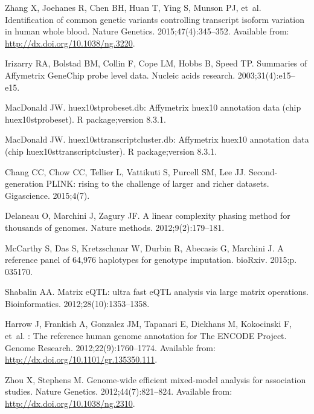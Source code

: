 \documentclass[10pt,letterpaper]{article}
\begin{document}
\begin{thebibliography}{10}
Zhang X, Joehanes R, Chen BH, Huan T, Ying S, Munson PJ, et~al.
\newblock Identification of common genetic variants controlling transcript
  isoform variation in human whole blood.
\newblock Nature Genetics. 2015;47(4):345--352.
\newblock Available from: \url{http://dx.doi.org/10.1038/ng.3220}.

Irizarry RA, Bolstad BM, Collin F, Cope LM, Hobbs B, Speed TP.
\newblock Summaries of Affymetrix GeneChip probe level data.
\newblock Nucleic acids research. 2003;31(4):e15--e15.

MacDonald JW.
\newblock huex10stprobeset.db: Affymetrix huex10 annotation data (chip
  huex10stprobeset).
\newblock R package;version 8.3.1.

MacDonald JW.
\newblock huex10sttranscriptcluster.db: Affymetrix huex10 annotation data (chip
  huex10sttranscriptcluster).
\newblock R package;version 8.3.1.

Chang CC, Chow CC, Tellier L, Vattikuti S, Purcell SM, Lee JJ.
\newblock Second-generation PLINK: rising to the challenge of larger and richer
  datasets.
\newblock Gigascience. 2015;4(7).

Delaneau O, Marchini J, Zagury JF.
\newblock A linear complexity phasing method for thousands of genomes.
\newblock Nature methods. 2012;9(2):179--181.

McCarthy S, Das S, Kretzschmar W, Durbin R, Abecasis G, Marchini J.
\newblock A reference panel of 64,976 haplotypes for genotype imputation.
\newblock bioRxiv. 2015;p. 035170.

Shabalin AA.
\newblock Matrix eQTL: ultra fast eQTL analysis via large matrix operations.
\newblock Bioinformatics. 2012;28(10):1353--1358.

Harrow J, Frankish A, Gonzalez JM, Tapanari E, Diekhans M, Kokocinski F, et~al.
: The reference human genome annotation for The {ENCODE}
  Project.
\newblock Genome Research. 2012;22(9):1760--1774.
\newblock Available from: \url{http://dx.doi.org/10.1101/gr.135350.111}.

Zhou X, Stephens M.
\newblock Genome-wide efficient mixed-model analysis for association studies.
\newblock Nature Genetics. 2012;44(7):821--824.
\newblock Available from: \url{http://dx.doi.org/10.1038/ng.2310}.


\end{thebibliography}
\end{document}
